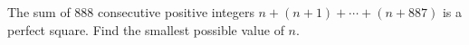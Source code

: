 The sum of $888$ consecutive positive integers $n+(n+1)+\cdots+(n+887)$ is a perfect square. Find the smallest possible value of $n$.

